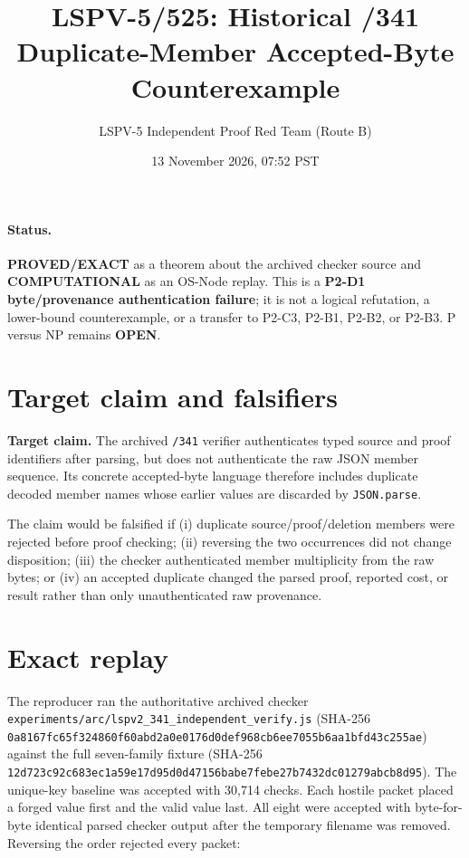 \documentclass[11pt]{article}
\title{LSPV-5/525: Historical /341 Duplicate-Member Accepted-Byte Counterexample}
\author{LSPV-5 Independent Proof Red Team (Route B)}
\date{13 November 2026, 07:52 PST}
\begin{document}
\maketitle

\paragraph{Status.} \textbf{PROVED/EXACT} as a theorem about the archived checker source and
\textbf{COMPUTATIONAL} as an OS-Node replay.  This is a \textbf{P2-D1 byte/provenance
authentication failure}; it is not a logical refutation, a lower-bound counterexample, or a
transfer to P2-C3, P2-B1, P2-B2, or P2-B3.  P versus NP remains \textbf{OPEN}.

\section{Target claim and falsifiers}
\textbf{Target claim.}  The archived \texttt{/341} verifier authenticates typed source and proof
identifiers after parsing, but does not authenticate the raw JSON member sequence.  Its concrete
accepted-byte language therefore includes duplicate decoded member names whose earlier values
are discarded by \texttt{JSON.parse}.

The claim would be falsified if (i) duplicate source/proof/deletion members were rejected before
proof checking; (ii) reversing the two occurrences did not change disposition; (iii) the checker
authenticated member multiplicity from the raw bytes; or (iv) an accepted duplicate changed the
parsed proof, reported cost, or result rather than only unauthenticated raw provenance.

\section{Exact replay}
The reproducer ran the authoritative archived checker
\texttt{experiments/arc/lspv2\_341\_independent\_verify.js} (SHA-256
\texttt{0a8167fc65f324860f60abd2a0e0176d0def968cb6ee7055b6aa1bfd43c255ae}) against
the full seven-family fixture (SHA-256
\texttt{12d723c92c683ec1a59e17d95d0d47156babe7febe27b7432dc01279abcb8d95}).
The unique-key baseline was accepted with 30,714 checks.  Each hostile packet placed a forged
value first and the valid value last.  All eight were accepted with byte-for-byte identical parsed
checker output after the temporary filename was removed.  Reversing the order rejected every
packet:
\end{document}
